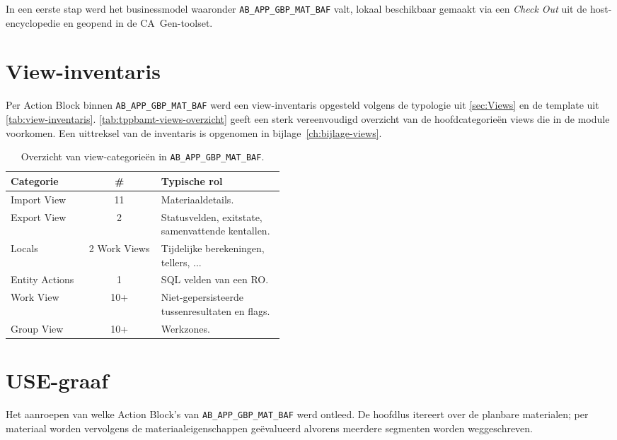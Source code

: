 In een eerste stap werd het businessmodel waaronder \texttt{AB\_APP\_GBP\_MAT\_BAF} valt, lokaal beschikbaar gemaakt via
een \emph{Check Out} uit de host-encyclopedie en geopend in de CA~Gen-toolset.

\section{View-inventaris}
\label{sec:re-views}

Per Action Block binnen \texttt{AB\_APP\_GBP\_MAT\_BAF} werd een view-inventaris opgesteld volgens de typologie uit
\autoref{sec:Views} en de template uit \autoref{tab:view-inventaris}. \autoref{tab:tppbamt-views-overzicht}
geeft een sterk vereenvoudigd overzicht van de hoofdcategorie\"en views die in de module voorkomen. 
Een uittreksel van de inventaris is opgenomen in bijlage~\ref{ch:bijlage-views}.

\begin{table}[h]
\centering
\caption[Overzicht view-categorie\"en in \texttt{AB\_APP\_GBP\_MAT\_BAF}]{Overzicht van view-categorie\"en in \texttt{AB\_APP\_GBP\_MAT\_BAF}.}
\label{tab:tppbamt-views-overzicht}
\begin{tabular}{|l|c|p{0.45\linewidth}|}
\hline
\textbf{Categorie} & \textbf{\#} & \textbf{Typische rol} \\
\hline
Import View & 11 & Materiaaldetails. \\
\hline
Export View & 2 & Statusvelden, exitstate, samenvattende kentallen. \\
\hline
Locals & 2 Work Views & Tijdelijke berekeningen, tellers, ... \\
\hline
Entity Actions & 1 & SQL velden van een RO. \\
\hline
Work View & 10+ & Niet-gepersisteerde tussenresultaten en flags. \\
\hline
Group View & 10+ & Werkzones. \\
\hline
\end{tabular}
\end{table}

\section{USE-graaf}
\label{sec:re-control-flow}

Het aanroepen van welke Action Block's van \texttt{AB\_APP\_GBP\_MAT\_BAF} werd ontleed. De hoofdlus itereert over
de planbare materialen; per materiaal worden vervolgens de materiaaleigenschappen ge\"evalueerd alvorens meerdere segmenten worden weggeschreven.

